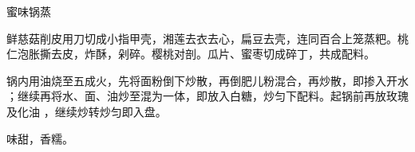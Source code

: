 \begin{recipe}[八宝锅蒸]{蜜味锅蒸}

\ingredients


\preparation

\step 鲜慈菇削皮用刀切成小指甲壳，湘莲去衣去心，扁豆去壳，连同百合上笼蒸粑。桃
仁泡胀撕去皮，炸酥，剁碎。樱桃对剖。瓜片、蜜枣切成碎丁，共成配料。

\step 锅内用油烧至五成火，先将面粉倒下炒散，再倒肥儿粉混合，再炒散，即掺入开水
；继续再将水、面、油炒至混为一体，即放入白糖，炒匀下配料。起锅前再放玫瑰及化油
，继续炒转炒匀即入盘。

\features

味甜，香糯。

\end{recipe}

